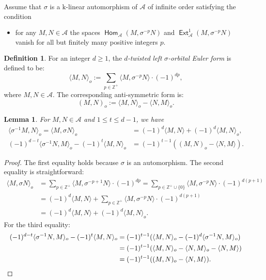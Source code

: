 \documentclass[reqno,12pt,a4paper]{amsart}
\newtheorem{lemma}[theorem]{Lemma}
\theoremstyle{remark}
\theoremstyle{definition}
\newtheorem{definition}[theorem]{Definition}
\newcommand{\opname}[1]{\operatorname{\mathsf{#1}}}
\newcommand{\Hom}{\opname{Hom}}
\newcommand{\Ext}{\opname{Ext}}
\newcommand{\ca}{{\mathcal A}}
\newcommand{\fk}{{\mathrm k}}
\numberwithin{equation}{section}
\begin{document}
Assume that $\sigma$ is a $\fk$-linear automorphism of $\mathcal{A}$ of infinite order satisfying the condition
\begin{itemize}
\item[(HF)]
for any $M,N\in\ca$ the spaces $\Hom_\ca(M,\sigma^{-p}N)$ and $\Ext^1_\ca(M,\sigma^{-p}N)$ vanish for all but finitely many positive integers $p$.
\end{itemize}

\begin{definition}
For an integer $d\geq 1$, the \emph{$d$-twisted left $\sigma$-orbital Euler form} is defined to be:
\[\langle M,N\rangle_o:=\sum_{p\in \mathbb{Z}^+}\langle M,\sigma^{-p}N\rangle\cdot(-1)^{dp},\]
where $M,N\in\ca$. The corresponding anti-symmetric form is:
\[ (M,N)_o:=\langle M,N\rangle_o-\langle N,M\rangle_o.\]
\end{definition}

\begin{lemma}
\label{lem:rotate-orbital-Euler-form}
For $M,N\in\ca$ and $1\leq t\leq d-1$, we have
\begin{align*}
\langle \sigma^{-1}M,N\rangle_o=\langle M,\sigma N\rangle_o&=(-1)^d \langle M,N\rangle+(-1)^d\langle M,N\rangle_o,\\
(-1)^{d-t}\langle \sigma^{-1}N,M\rangle_o-(-1)^{t}\langle M,N\rangle_o&=(-1)^{t-1}((M,N)_o-\langle N,M\rangle).
\end{align*}
\end{lemma}
\begin{proof}
The first equality holds because $\sigma$ is an automorphism. The second equality is straightforward:
\begin{align*}
\langle M,\sigma N\rangle_o&=\sum_{p\in \mathbb{Z}^+}\langle M,\sigma^{-p+1}N\rangle\cdot(-1)^{dp}=\sum_{p\in \mathbb{Z}^+\cup\{0\}}\langle M,\sigma^{-p}N\rangle\cdot(-1)^{d(p+1)}\\
&=(-1)^d\langle M,N\rangle+\sum_{p\in \mathbb{Z}^+}\langle M,\sigma^{-p}N\rangle\cdot(-1)^{d(p+1)}\\
&=(-1)^d \langle M,N\rangle+(-1)^d\langle M,N\rangle_o.
\end{align*}
For the third equality:
\begin{align*}
(-1)^{d-t}\langle \sigma^{-1}N,M\rangle_o-(-1)^{t}\langle M,N\rangle_o&=(-1)^{t-1}(\langle M,N\rangle_o-(-1)^{d}\langle \sigma^{-1}N,M\rangle_o)\\
&=(-1)^{t-1}(\langle M,N\rangle_o-\langle N,M\rangle_o-\langle N,M\rangle)\\
&=(-1)^{t-1}((M,N)_o-\langle N,M\rangle).\qedhere
\end{align*}
\end{proof}
\end{document}

